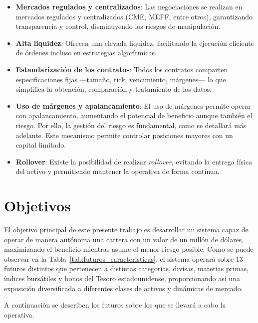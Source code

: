 \begin{itemize}
    \item \textbf{Mercados regulados y centralizados}: Las negociaciones se realizan en mercados regulados y centralizados (CME, MEFF, entre otros),
    garantizando transparencia y control, disminuyendo los riesgos de manipulación.    
    \item \textbf{Alta liquidez}: Ofrecen una elevada liquidez, facilitando la ejecución eficiente de órdenes incluso en estrategias algorítmicas.
    \item \textbf{Estandarización de los contratos}: Todos los contratos comparten especificaciones fijas —tamaño, tick, vencimiento, márgenes— lo que
    simplifica la obtención, comparación y tratamiento de los datos.
    \item \textbf{Uso de márgenes y apalancamiento}: El uso de márgenes permite operar con apalancamiento, aumentando el potencial de beneficio aunque
    también el riesgo. Por ello, la gestión del riesgo es fundamental, como se detallará más adelante. Este mecanismo permite controlar posiciones
    mayores con un capital limitado.
    \item \textbf{Rollover}: Existe la posibilidad de realizar \textit{rollover}, evitando la entrega física del activo y permitiendo mantener la
    operativa de forma continua.
\end{itemize}

\section{Objetivos}

El objetivo principal de este presente trabajo es desarrollar un sistema capaz de operar de manera autónoma una cartera con un valor de un millón de
dólares, maximizando el beneficio mientras asume el menor riesgo posible. Como se puede observar en la Tabla~\ref{tab:futuros_caracteristicas}, el
sistema operará sobre 13 futuros distintos que pertenecen a distintas categorías, divisas, materias primas, índices bursátiles y bonos del Tesoro
estadounidense, proporcionando así una exposición diversificada a diferentes clases de activos y dinámicas de mercado.

A continuación se describen los futuros sobre los que se llevará a cabo la operativa.

